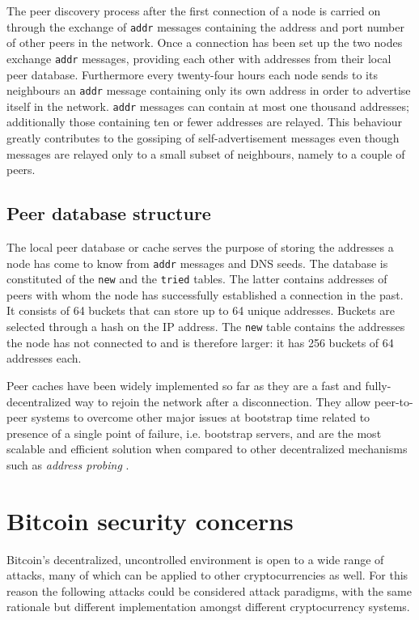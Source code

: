 \documentclass[12pt, letterpaper, twoside]{article}
\begin{document}
The peer discovery process after the first connection of a node is carried on through the exchange of \texttt{addr} messages containing the address and port number of other peers in the network. Once a connection has been set up the two nodes exchange \texttt{addr} messages, providing each other with addresses from their local peer database. Furthermore every twenty-four hours each node sends to its neighbours an \texttt{addr} message containing only its own address in order to advertise itself in the network. \texttt{addr} messages can contain at most one thousand addresses; additionally those containing ten or fewer addresses are relayed. This behaviour greatly contributes to the gossiping of self-advertisement messages even though messages are relayed only to a small subset of neighbours, namely to a couple of peers.

\subsection{Peer database structure}\label{cachestruct}
The local peer database or cache serves the purpose of storing the addresses a node has come to know from \texttt{addr} messages and DNS seeds. The database is constituted of the \texttt{new} and the \texttt{tried} tables. The latter contains addresses of peers with whom the node has successfully established a connection in the past. It consists of 64 buckets that can store up to 64 unique addresses. Buckets are selected through a hash on the IP address. The \texttt{new} table contains the addresses the node has not connected to and is therefore larger: it has 256 buckets of 64 addresses each.

Peer caches have been widely implemented so far as they are a fast and fully-decentralized way to rejoin the network after a disconnection. They allow peer-to-peer systems to overcome other major issues at bootstrap time related to presence of a single point of failure, i.e. bootstrap servers, and are the most scalable and efficient solution when compared to other decentralized mechanisms such as \textit{address probing} \cite{decentrbootstrapp2p}.

\section{Bitcoin security concerns}\label{securityintro}
Bitcoin's decentralized, uncontrolled environment is open to a wide range of attacks, many of which can be applied to other cryptocurrencies as well. For this reason the following attacks could be considered attack paradigms, with the same rationale but different implementation amongst different cryptocurrency systems.
\end{document}
